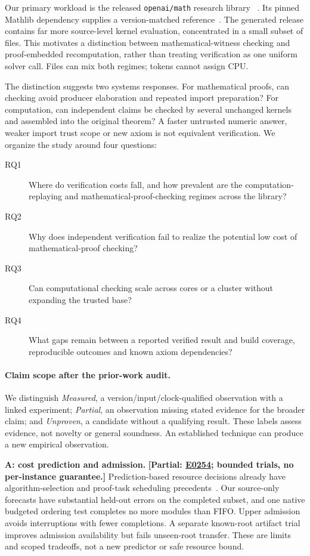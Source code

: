 \documentclass[10pt,twocolumn]{article}
\newcommand{\partialev}[1]{\textbf{[Partial: #1]}}
\newcommand{\expref}[2]{\href{https://github.com/yunwei37/proofserve/blob/main/docs/tmp/build-and-evaluate/step-#1/step-report.md}{E#2}}
\begin{document}
Our primary workload is the released \texttt{openai/math} research library
~\cite{openaiMathSource}. Its pinned Mathlib dependency supplies a
version-matched reference~\cite{mathlibD13fSource2026}.
The generated release contains far more source-level kernel evaluation,
concentrated in a small subset of files.
This motivates a distinction between mathematical-witness checking and
proof-embedded recomputation, rather than treating verification as one
uniform solver call. Files can mix both regimes; tokens cannot assign CPU.

The distinction suggests two systems responses.
For mathematical proofs, can checking avoid producer elaboration and
repeated import preparation?
For computation, can independent claims be checked by several unchanged
kernels and assembled into the original theorem?
A faster untrusted numeric answer, weaker import trust scope or new axiom
is not equivalent verification.
We organize the study around four questions:
\begin{description}
\item[RQ1] Where do verification costs fall, and how prevalent are the
computation-replaying and mathematical-proof-checking regimes across the library?
\item[RQ2] Why does independent verification fail to realize the potential
low cost of mathematical-proof checking?
\item[RQ3] Can computational checking scale across cores or a cluster
without expanding the trusted base?
\item[RQ4] What gaps remain between a reported verified result and build
coverage, reproducible outcomes and known axiom dependencies?
\end{description}

\paragraph{Claim scope after the prior-work audit.}
We distinguish \emph{Measured}, a version/input/clock-qualified observation
with a linked experiment; \emph{Partial}, an observation missing stated
evidence for the broader claim; and \emph{Unproven}, a candidate without
a qualifying result. These labels assess evidence, not novelty or general
soundness. An established technique can produce a new empirical observation.

\textbf{A: cost prediction and admission.}
\partialev{\expref{0254-20261101T195608+0000}{0254}; bounded trials, no per-instance guarantee.}
Prediction-based resource decisions already have algorithm-selection and
proof-task scheduling precedents~\cite{satzilla2008,coqAsyncManual2023}.
Our source-only forecasts have substantial held-out errors on the completed
subset, and one native budgeted ordering test completes no more modules
than FIFO. Upper admission avoids interruptions with fewer completions.
A separate known-root artifact trial improves admission availability but
fails unseen-root transfer. These are limits and scoped tradeoffs, not a new
predictor or safe resource bound.
\end{document}
